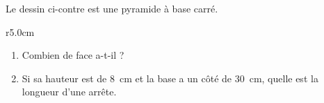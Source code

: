 
\begin{exercice}\label{exo2smath-0180}


Le dessin ci-contre est une pyramide à base carré.
\begin{wrapfigure}{r}{5.0cm}
   \vspace{-0.5cm}        %
   \centering
   
\end{wrapfigure}
\begin{enumerate}
    \item
Combien de face a-t-il ?
    \item
        Si sa hauteur est de \SI{8}{\centi\meter} et la base a un côté de \SI{30}{\centi\meter}, quelle est la longueur d'une arrête.
\end{enumerate}

\end{exercice}
